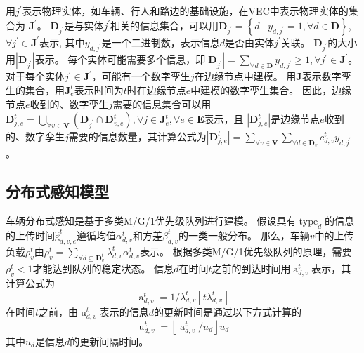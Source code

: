 用$j^{\prime}$表示物理实体，如车辆、行人和路边的基础设施，在VEC中表示物理实体的集合为 $\mathbf{J}^{\prime}$。
$\mathbf{D}_{j^{\prime}}$是与实体$j^{\prime}$相关的信息集合，可以用$\mathbf{D}_{j^{\prime}}=\left\{d \mid y_{d,j^{\prime}} = 1, \forall d \in \mathbf{D} \right\}$, $\forall j^{\prime} \in \mathbf{J}^{\prime}$表示, 其中$y_{d, j^{\prime}}$是一个二进制数，表示信息$d$是否由实体$j^{\prime}$关联。
$\mathbf{D}_{j^{\prime}}$的大小用$|\mathbf{D}_{j^{\prime}}|$表示。
每个实体可能需要多个信息，即$|\mathbf{D}_{j^{\prime}}| = \sum_{\forall d \in \mathbf{D}}y_{d, j^{\prime}} \geq 1, \forall j^{\prime} \in \mathbf{J}^{\prime}$。
对于每个实体$j^{\prime} \in \mathbf{J}^{\prime}$，可能有一个数字孪生$j$在边缘节点中建模。
用$\mathbf{J}$表示数字孪生的集合，用$\mathbf{J}_e^{t}$表示时间为$t$时在边缘节点$e$中建模的数字孪生集合。
因此，边缘节点$e$收到的、数字孪生$j$需要的信息集合可以用$\mathbf{D}_{j, e}^t=\bigcup_{\forall v \in \mathbf{V}}\left(\mathbf{D}_{j^{\prime}} \cap \mathbf{D}_{v, e}^t\right), \forall j \in \mathbf{J}_e^{t}, \forall e \in \mathbf{E}$表示，且 $| \mathbf{D}_{j, e}^t |$是边缘节点$e$收到的、数字孪生$j$需要的信息数量，其计算公式为$| \mathbf{D}_{j, e}^t | =  \sum_{\forall v \in \mathbf{V}} \sum_{\forall d \in \mathbf{D}_v} c_{d, v}^t  y_{d, j^{\prime}}$。

\subsection{分布式感知模型}
车辆分布式感知是基于多类M/G/1优先级队列\cite{moltafet2020age}进行建模。
假设具有$\operatorname{type}_d$的信息的上传时间$\operatorname{\hat{g}}_{d, v, e}^t$遵循均值$\alpha_{d, v}^t$和方差$\beta_{d, v}^t$的一类一般分布。
那么，车辆$v$中的上传负载$\rho_{v}^{t}$由$ \rho_{v}^{t}=\sum_{\forall d \subseteq \mathbf{D}_v^t} \lambda_{d, v}^{t} \alpha_{d, v}^t$表示。
根据多类M/G/1优先级队列的原理，需要$\rho_{v}^{t} < 1$才能达到队列的稳定状态。
信息$d$在时间$t$之前的到达时间用$\operatorname{a}_{d, v}^t$表示，其计算公式为
\begin{equation}
    \operatorname{a}_{d, v}^t = { {1}/{\lambda_{d, v}^{t}} \left \lfloor t \lambda_{d, v}^t \right \rfloor} 
\end{equation}
在时间$t$之前，由$\operatorname{u}_{d, v}^t$表示的信息$d$的更新时间是通过以下方式计算的
\begin{equation}
    \operatorname{u}_{d, v}^t = \left \lfloor  {\operatorname{a}_{d, v}^t}/{u_d} \right \rfloor  u_d
\end{equation}
其中$u_d$是信息$d$的更新间隔时间。


